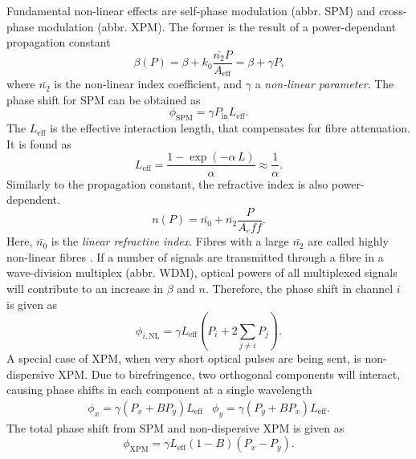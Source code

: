 \documentclass{standalone}
\begin{document}
Fundamental non-linear effects are self-phase modulation (abbr. SPM) and cross-phase modulation (abbr. XPM). The former is the result of a power-dependant propagation constant
\begin{equation}
\beta(P) = \beta + k_0 \frac{\bar{n_2} P}{A_\textrm{eff}} = \beta + \gamma P \textrm{,}
\end{equation}
where $\bar{n_2}$ is the non-linear index coefficient, and $\gamma$ a \textit{non-linear parameter}. The phase shift for SPM can be obtained as
\begin{equation}
\phi_\textrm{SPM} = \gamma P_\textrm{in} L_\textrm{eff} \textrm{.}
\end{equation}
The $L_\textrm{eff}$ is the effective interaction length, that compensates for fibre attenuation. It is found as
\begin{equation}
L_\textrm{eff} = \frac{1 - \exp\left(-\alpha \, L\right)}{\alpha} \approx \frac{1}{\alpha} \textrm{.}
\end{equation}
Similarly to the propagation constant, the refractive index is also power-dependent.
\begin{equation}
n(P) = \bar{n_0} + \bar{n_2} \frac{P}{A_eff} \textrm{.}
\end{equation}
Here, $\bar{n_0}$ is the \textit{linear refractive index}. Fibres with a large $\bar{n_2}$ are called highly non-linear fibres \cite{Hiroishi2003}. If a number of signals are transmitted through a fibre in a wave-division multiplex (abbr. WDM), optical powers of all multiplexed signals will contribute to an increase in $\beta$ and $n$. Therefore, the phase shift in channel $i$ is given as
\begin{equation}
\phi_{i,\textrm{NL}} = \gamma L_\textrm{eff} \left( P_i + 2 \sum_{j\ne i} P_j \right) \textrm{.}
\end{equation}
A special case of XPM, when very short optical pulses are being sent, is non-dispersive XPM. Due to birefringence, two orthogonal components will interact, causing phase shifts in each component at a single wavelength
\begin{eqnarray}
\phi_x = \gamma \left(P_x + B P_y\right) L_\textrm{eff} & \phi_y = \gamma \left( P_y + B P_x \right) L_\textrm{eff} \textrm{.}
\end{eqnarray}
The total phase shift from SPM and non-dispersive XPM is given as
\begin{equation}
\phi_\textrm{XPM} = \gamma L_\textrm{eff} \left(1 - B\right) \left(P_x - P_y\right) \textrm{.}
\end{equation}
\end{document}
